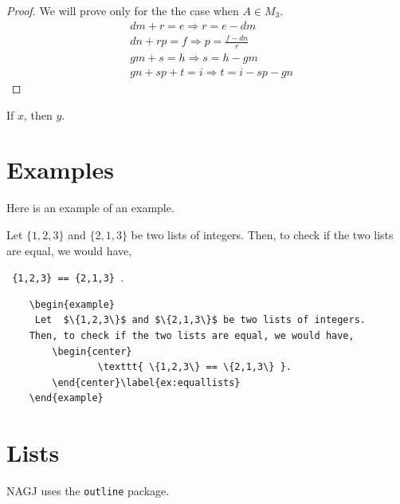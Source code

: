 \begin{proof} We will prove only for the the case when $A \in M_3$. \\
 \begin{align} 
	&dm + r = e  \Rightarrow r = e-dm \label{eqn:1}\\
	&dn + rp = f \Rightarrow p=\frac{f-dn}{r} \label{eqn:2}\\
	&gm + s = h \Rightarrow s = h - gm \label{eqn:3}\\
	&gn + sp + t = i \Rightarrow t  = i-sp-gn \label{eqn:4}
 \end{align}
\end{proof} %
 

\begin{corollary}
 If $x$, then $y$.
\end{corollary}



\section{Examples}\label{ex:x1}
Here is an example of an example.


\begin{example}
Let  $\{1,2,3\}$ and $\{2,1,3\}$ be two lists of integers.  
Then, to check if the two lists are equal, we would have,   
    \begin{center}
        \texttt{ \{1,2,3\} == \{2,1,3\} }.
    \end{center}\label{ex:equallists}
\end{example}


\begin{verbatim}
    \begin{example}
     Let  $\{1,2,3\}$ and $\{2,1,3\}$ be two lists of integers.  
	Then, to check if the two lists are equal, we would have,   
	    \begin{center}
                \texttt{ \{1,2,3\} == \{2,1,3\} }.
	    \end{center}\label{ex:equallists}
    \end{example}
\end{verbatim}



 \section{Lists}
 NAGJ uses the \verb|outline| package.   
  

